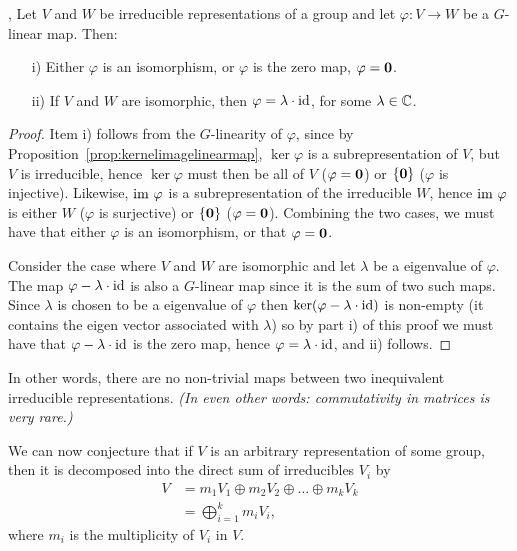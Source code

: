 \begin{theorem}\cite[Lemma.1.7.]{FultonHarris}, \cite[Prop.2.4.]{Serre}
	Let $V$ and $W$ be irreducible representations of a group and let $\varphi: V \rightarrow W$ be a $G$-linear map. Then:
	\begin{itemize}
		\item[i)] Either $\varphi$ is an isomorphism, or $\varphi$ is the zero map, $\varphi = \mathbf{0}$.
		\item[ii)] If $V$ and $W$ are isomorphic, then $\varphi = \lambda \cdot \text{id}$, for some $\lambda \in \mathbb{C}$.
	\end{itemize}
\end{theorem}
\begin{proof}
	Item i) follows from the $G$-linearity of $\varphi$, since by Proposition~\ref{prop:kernelimagelinearmap}, $\ker \varphi$ is a subrepresentation of $V$, but $V$ is irreducible, hence $\ker \varphi$ must then be all of $V$ ($\varphi = \mathbf{0}$) or $\{\mathbf{0}\}$ ($\varphi$ is injective). Likewise, $\text{im } \varphi$ is a subrepresentation of the irreducible $W$, hence $\text{im } \varphi$ is either $W$ ($\varphi$ is surjective) or $\{\mathbf{0}\}$ ($\varphi = \mathbf{0}$). Combining the two cases, we must have that either $\varphi$ is an isomorphism, or that $\varphi = \mathbf{0}$.
	
	Consider the case where $V$ and $W$ are isomorphic and let $\lambda$ be a eigenvalue of $\varphi$. The map $\varphi - \lambda \cdot \text{id}$ is also a $G$-linear map since it is the sum of two such maps. Since $\lambda$ is chosen to be a eigenvalue of $\varphi$ then $\ker(\varphi - \lambda \cdot \text{id})$ is non-empty (it contains the eigen vector associated with $\lambda$) so by part i) of this proof we must have that $\varphi - \lambda \cdot \text{id}$ is the zero map, hence $\varphi = \lambda \cdot \text{id}$, and ii) follows.
\end{proof}

In other words, there are no non-trivial maps between two inequivalent irreducible representations. \textit{(In even other words: commutativity in matrices is very rare.)}

We can now conjecture that if $V$ is an arbitrary representation of some group, then it is decomposed into the direct sum of irreducibles $V_i$ by
\begin{align*}
	V &= m_1 V_1 \oplus m_2 V_2 \oplus \dots \oplus m_k V_k \\
	&= \bigoplus_{i=1}^k m_i V_i,
\end{align*}
where $m_i$ is the multiplicity of $V_i$ in $V$.

